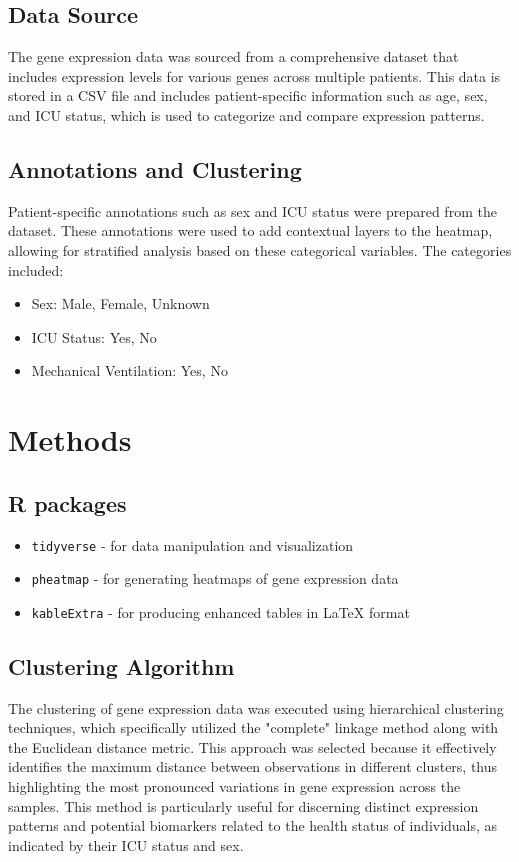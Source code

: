\documentclass{article}
\begin{document}
\subsection{Data Source}
The gene expression data was sourced from a comprehensive dataset that includes expression levels for various genes across multiple patients.\cite{Overmyer2021} This data is stored in a CSV file and includes patient-specific information such as age, sex, and ICU status, which is used to categorize and compare expression patterns.
\subsection{Annotations and Clustering}
Patient-specific annotations such as sex and ICU status were prepared from the dataset. These annotations were used to add contextual layers to the heatmap, allowing for stratified analysis based on these categorical variables. The categories included:
\begin{itemize}
    \item Sex: Male, Female, Unknown
    \item ICU Status: Yes, No
    \item Mechanical Ventilation: Yes, No
\end{itemize}
\section{Methods}
\subsection{R packages}

\begin{itemize}
    \item \texttt{tidyverse} - for data manipulation and visualization \cite{Wickham2019}
    \item \texttt{pheatmap} - for generating heatmaps of gene expression data\cite{Kolde2022}
    \item \texttt{kableExtra} - for producing enhanced tables in LaTeX format \cite{Zhu2018}
\end{itemize}
\subsection{Clustering Algorithm}

The clustering of gene expression data was executed using hierarchical clustering techniques, which specifically utilized the "complete" linkage method along with the Euclidean distance metric. This approach was selected because it effectively identifies the maximum distance between observations in different clusters, thus highlighting the most pronounced variations in gene expression across the samples. This method is particularly useful for discerning distinct expression patterns and potential biomarkers related to the health status of individuals, as indicated by their ICU status and sex.
\end{document}
